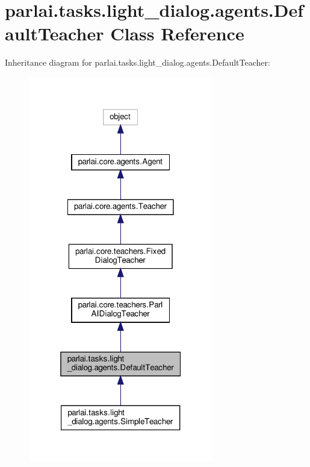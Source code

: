 \hypertarget{classparlai_1_1tasks_1_1light__dialog_1_1agents_1_1DefaultTeacher}{}\section{parlai.\+tasks.\+light\+\_\+dialog.\+agents.\+Default\+Teacher Class Reference}
\label{classparlai_1_1tasks_1_1light__dialog_1_1agents_1_1DefaultTeacher}


Inheritance diagram for parlai.\+tasks.\+light\+\_\+dialog.\+agents.\+Default\+Teacher\+:
\nopagebreak
\begin{figure}[H]
\begin{center}
\leavevmode
\includegraphics[width=229pt]{d0/d5f/classparlai_1_1tasks_1_1light__dialog_1_1agents_1_1DefaultTeacher__inherit__graph}
\end{center}
\end{figure}


